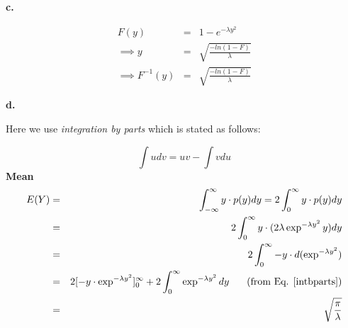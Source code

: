 \documentclass[11pt]{article}
\begin{document}
\par \textbf{c.} 
\vspace{-10pt}

\begin{eqnarray*}
F(y) &=& 1 - e^{-\lambda y^2} \\
\implies y &=& \sqrt{\frac{-ln(1-F)}{\lambda}} \\
\implies F^{-1}(y) &=& \sqrt{\frac{-ln(1-F)}{\lambda}}
\end{eqnarray*}

\par \textbf{d.}

\hspace{50pt} Here we use  \emph{integration by parts} which is stated as follows:

\begin{equation}
  \int u dv = uv - \int v du
\label{intbparts}
\end{equation}
\hspace{50pt} \textbf{Mean}
\vspace{-8pt}
\begin{eqnarray*}
\centering
 E(Y) &=& \int_{-\infty}^\infty y \cdot p(y) dy = 2\int_{0}^\infty y \cdot p(y) dy\\
     &=& 2\int_{0}^\infty y \cdot (2\lambda \exp^{-\lambda y^2} y) dy \\
     &=& 2\int_{0}^\infty -y \cdot d(\exp^{-\lambda y^2}) \\
     &=& 2[-y \cdot \exp^{-\lambda y^2}]_0^\infty + 2\int_{0}^\infty \exp^{-\lambda y^2} dy \; \; \; \; \: \: \: \mbox{(from Eq. \ref{intbparts})} \\
     &=& \sqrt{\frac{\pi}{\lambda}}
\end{eqnarray*}
\end{document}
